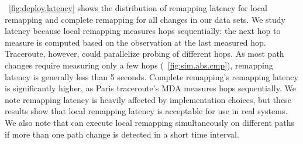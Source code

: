 
\figstr~\ref{fig:deploy.latency} shows the distribution of remapping
latency for local remapping and complete remapping for all changes in
our data sets.  We study latency because local remapping
measures hops sequentially: the next hop to measure is computed based on
the observation at the last measured hop.  Traceroute, however, could
parallelize probing of different hops.  As most path changes require
measuring only a few hops (\figstr~\ref{fig:sim.abs.cmp}), remapping
latency is generally less than 5 seconds.  Complete remapping's
remapping latency is significantly higher, as Paris traceroute's MDA
measures hops sequentially.  We note remapping latency is heavily
affected by implementation choices, but these results show that local
remapping latency is acceptable for use in real systems.  We also note
that \dtrack{} can execute local remapping simultaneously on different
paths if more than one path change is detected in a short time interval.


